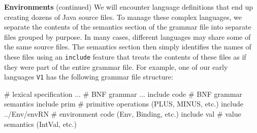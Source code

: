 \begin{minipage}[t]{\sw}
\slidenumber
\LARGE
{\bf Environments} (continued)\exx
We will encounter language definitions
that end up creating dozens of Java source files.
To manage these complex languages,
we separate the contents of the semantics section of the grammar file
into separate files grouped by purpose.
In many cases, different languages may share some of the same source files.
The semantics section then simply identifies the names of these files
using an \verb'include' feature
that treats the contents of these files
as if they were part of the entire grammar file.\exx
For example, one of our early languages \verb'V1'
has the following grammar file structure:
{\Large
\begin{qv}
# lexical specification
...
%
# BNF grammar
...
%
include code            # BNF grammar semantics
include prim            # primitive operations (PLUS, MINUS, etc.)
include ../Env/envRN    # environment code (Env, Binding, etc.)
include val             # value semantics (IntVal, etc.)
\end{qv}
}
\end{minipage}
\clearpage
